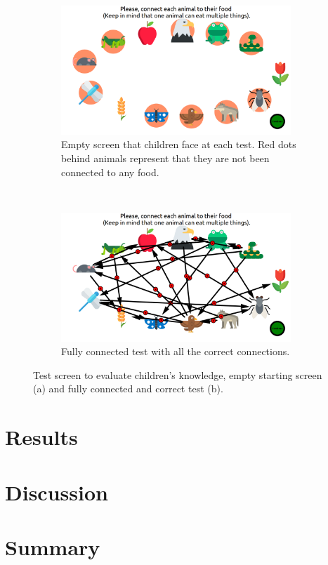 \begin{figure}[ht]
	\centering
	\begin{subfigure}[t]{0.5\textwidth}
		\centering
		\includegraphics[width=0.95\textwidth]{empty_graph.png}
		\captionsetup{width=.95\linewidth}
		\caption{Empty screen that children face at each test. Red dots behind animals represent that they are not been connected to any food.}
		\end{subfigure}%
		~ 
		\begin{subfigure}[t]{0.5\textwidth}
			\centering
			\includegraphics[width=0.95\textwidth]{full_graph.png}
			\captionsetup{width=.95\linewidth}
			\caption{Fully connected test with all the correct connections.}
			\end{subfigure}
			\caption{Test screen to evaluate children's knowledge, empty starting screen (a) and fully connected and correct test (b).}
			\label{fig:test}
			\end{figure}
\section{Results}

\section{Discussion}

\section{Summary}

